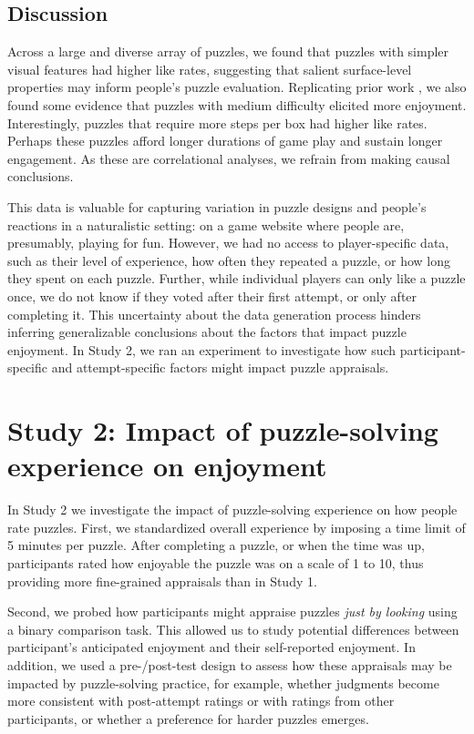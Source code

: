 \documentclass[10pt,letterpaper]{article}
\begin{document}
\subsection{Discussion}

Across a large and diverse array of puzzles, we found that puzzles with simpler visual features had higher like rates, suggesting that salient surface-level properties may inform people's puzzle evaluation. 
Replicating prior work \cite{braendle2024fun},
we also found some evidence that puzzles with medium difficulty elicited more enjoyment. Interestingly, puzzles that require more steps per box had higher like rates. Perhaps these puzzles afford longer durations of game play and sustain longer engagement. As these are correlational analyses, we refrain from making causal conclusions. 

This data is valuable for capturing variation in puzzle designs and people's reactions in a naturalistic setting: on a game website where people are, presumably, playing for fun. However, we had no access to player-specific data, such as their level of experience, how often they repeated a puzzle, or how long they spent on each puzzle. Further, while individual players can only like a puzzle once, we do not know if they voted after their first attempt, or only after completing it. This uncertainty about the data generation process hinders inferring generalizable conclusions about the factors that impact puzzle enjoyment. In Study 2, we ran an experiment to investigate how such participant-specific and attempt-specific factors might impact puzzle appraisals. 

\section{Study 2: Impact of puzzle-solving experience on enjoyment}

In Study 2 we investigate the impact of puzzle-solving experience on how people rate puzzles. First, we standardized overall experience by imposing a time limit of 5 minutes per puzzle. After completing a puzzle, or when the time was up, participants rated how enjoyable the puzzle was on a scale of 1 to 10, thus providing more fine-grained appraisals than in Study 1.

Second, we probed how participants might appraise puzzles \textit{just by looking} using a binary comparison task. This allowed us to study potential differences between participant's anticipated enjoyment and their self-reported enjoyment. 
In addition, we used a pre-/post-test design to assess how these appraisals may be impacted by puzzle-solving practice, for example, whether judgments become more consistent with post-attempt ratings or with ratings from other participants, or whether a preference for harder puzzles emerges.
\end{document}
